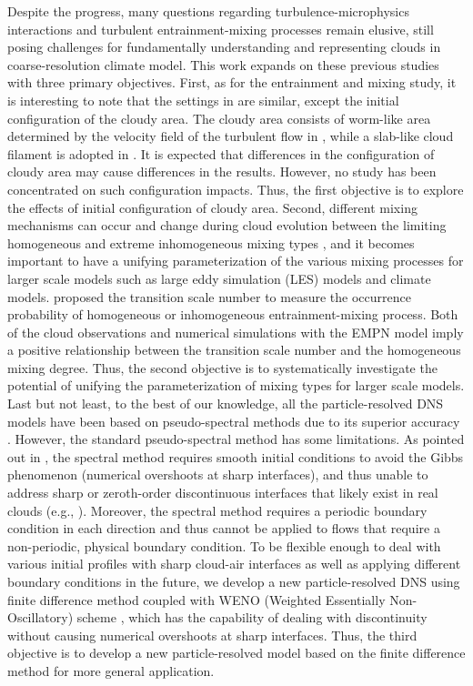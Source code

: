 \documentclass[draft,jgrga]{AGUTeX}
\begin{document}
\begin{article}
Despite the progress, many questions regarding turbulence-microphysics interactions and turbulent entrainment-mixing processes remain elusive, still posing challenges for fundamentally understanding and representing clouds in coarse-resolution climate model. This work expands on these previous studies with three primary objectives. First, as for the entrainment and mixing study, it is interesting to note that the settings in \cite{Kumar12, And04} are similar, except the initial configuration of the cloudy area. The cloudy area consists of worm-like area determined by the velocity field of the turbulent flow in \cite{And04}, while a slab-like cloud filament is adopted in \cite{Kumar12}. It is expected that differences in the configuration of cloudy area may cause differences in the results. However, no study has been concentrated on such configuration impacts. Thus, the first objective is to explore the effects of initial configuration of cloudy area. Second, different mixing mechanisms can occur and change during cloud evolution between the limiting homogeneous and extreme inhomogeneous mixing types \cite{And09, Burnet1992, Lehmann09}, and it becomes important to have a unifying parameterization of the various mixing processes for larger scale models such as large eddy simulation (LES) models and climate models. \cite{Lu2013} proposed the transition scale number to measure the occurrence probability of homogeneous or inhomogeneous entrainment-mixing process. Both of the cloud observations and numerical simulations with the EMPN model imply a positive relationship between the transition scale number and the homogeneous mixing degree. Thus, the second objective is to systematically investigate the potential of unifying the parameterization of mixing types for larger scale models. Last but not least, to the best of our knowledge, all the particle-resolved DNS models have been based on pseudo-spectral methods due to its superior accuracy \cite{Rogallo81, Orszag72, Celani05, Kumar12}. However, the standard pseudo-spectral method has some limitations. As pointed out in \cite{Kumar12}, the spectral method requires smooth initial conditions to avoid the Gibbs phenomenon (numerical overshoots at sharp interfaces), and thus unable to address sharp or zeroth-order discontinuous interfaces that likely exist in real clouds (e.g., \cite{Brenguier1993}). Moreover, the spectral method requires a periodic boundary condition in each direction and thus cannot be applied to flows that require a non-periodic, physical boundary condition. To be flexible enough to deal with various initial profiles with sharp cloud-air interfaces as well as applying different boundary conditions in the future, we develop a new particle-resolved DNS using finite difference method coupled with WENO (Weighted Essentially Non-Oscillatory) scheme \cite{JiangShu1996}, which has the capability of dealing with discontinuity without causing numerical overshoots at sharp interfaces. Thus, the third objective is to develop a new particle-resolved model based on the finite difference method for more general application.


\end{article}
\end{document}
